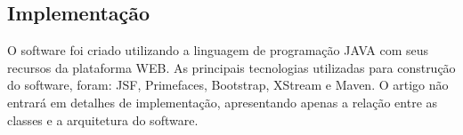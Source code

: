 
		


		

\subsection{Implementação}\label{ferramentaImplementacao}
O software foi criado utilizando a linguagem de programação JAVA com seus recursos da plataforma WEB. As principais tecnologias utilizadas para construção do software, foram: JSF, Primefaces, Bootstrap, XStream e Maven. O artigo não entrará em detalhes de implementação, apresentando apenas a relação entre as classes e a arquitetura do software.

